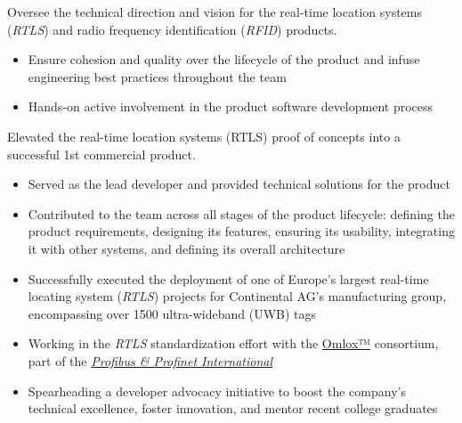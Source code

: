 \documentclass[10pt,a4paper,ragged2e,withhyper]{altacv}
\begin{document}
\begin{paracol}{2}


Oversee the technical direction and vision for the real-time location systems (\textit{RTLS}) and radio frequency identification (\textit{RFID}) products.

\medskip

\begin{itemize}
\item Ensure cohesion and quality over the lifecycle of the product and infuse engineering best practices throughout the team
\item Hands-on active involvement in the product software development process
\end{itemize}

\divider

\smallskip


Elevated the real-time location systems (RTLS) proof of concepts into a successful 1st commercial product.

\medskip

\begin{itemize}
  \item Served as the lead developer and provided technical solutions for the product
  \item Contributed to the team across all stages of the product lifecycle: defining the product requirements, designing its features, ensuring its usability, integrating it with other systems, and defining its overall architecture
  \item Successfully executed the deployment of one of Europe's largest real-time locating system (\textit{RTLS}) projects for Continental AG's manufacturing group, encompassing over 1500 ultra-wideband (UWB) tags
  \item Working in the \textit{RTLS} standardization effort with the \href{https://omlox.com/}{Omlox™} consortium, part of the \href{https://www.profibus.com/technology/omlox}{\textit{Profibus \& Profinet International}}
  \item Spearheading a developer advocacy initiative to boost the company's technical excellence, foster innovation, and mentor recent college graduates
\end{itemize}


\end{paracol}
\end{document}
